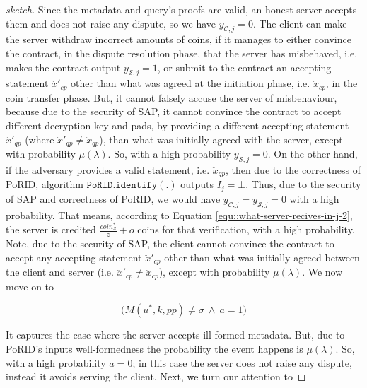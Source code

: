 \begin{proof}[sketch]
  Since the metadata and query's proofs are valid, an honest server accepts them and does not raise any dispute, so we have $y_{\scriptscriptstyle\mathcal{C},j}=0$.  The client can  make the server  withdraw incorrect amounts of coins, if it manages to either convince the contract, in the dispute resolution phase,  that the server has misbehaved, i.e. makes the contract output $y_{\scriptscriptstyle\mathcal{S},j}=1$, or submit to the contract  an accepting  statement $\ddot{x}'_{\scriptscriptstyle cp}$ other than what was agreed at the initiation phase, i.e. $\ddot{x}_{\scriptscriptstyle cp}$, in the coin transfer phase. But, it cannot falsely accuse the server of misbehaviour, because due to the security of SAP, it cannot  convince the contract to accept different decryption key and pads, by providing a different accepting statement $\ddot{x}'_{\scriptscriptstyle qp}$  (where $\ddot{x}'_{\scriptscriptstyle qp}\neq \ddot{x}_{\scriptscriptstyle qp}$), than what was initially agreed with the server, except with  probability $\mu(\lambda)$.  So, with a high probability $y_{\scriptscriptstyle\mathcal{S},j}=0$. On the other hand, if the adversary provides a valid statement, i.e. $\ddot{x}_{\scriptscriptstyle qp}$, then due to the correctness of PoRID, algorithm $\mathtt{PoRID.identify}(.)$ outputs $I_{\scriptscriptstyle j}=\bot$. Thus, due to the security of SAP and correctness of PoRID,  we would have $y_{\scriptscriptstyle\mathcal{C},j}=y_{\scriptscriptstyle\mathcal{S},j}=0$ with a high probability.    That means, according to  Equation \ref{equ::what-server-recives-in-j-2}, the server is credited $\frac{coin_{\scriptscriptstyle\mathcal S}^{\scriptscriptstyle*}}{z}+o$ coins for that verification, with a  high probability. Note,  due to the security of SAP, the client cannot convince the contract to accept any accepting statement $\ddot{x}'_{\scriptscriptstyle cp}$ other than what was initially agreed  between the client and server (i.e. $\ddot{x}'_{\scriptscriptstyle cp}\neq \ddot{x}_{\scriptscriptstyle cp}$), except with   probability $\mu(\lambda)$. We now move on  to 
  
  $$\Big(M(u^{\scriptscriptstyle *},k,{pp})\neq \sigma\ \wedge \ a=1\Big)$$
     
     
    It captures the case where the server accepts  ill-formed metadata. But, due to PoRID's inputs well-formedness the probability the event happens is  $\mu(\lambda)$. So, with a high probability $a=0$; in this case  the server does not raise any dispute, instead it avoids serving the client.    Next, we turn our attention   to 
     

\end{proof}

